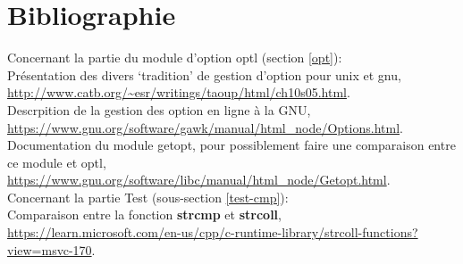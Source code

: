 \documentclass[12pt]{article}
\begin{document}
    \section{Bibliographie}
        \noindent Concernant la partie du module d'option optl 
        (section \ref{opt}):\\ Présentation des divers `tradition' de gestion 
        d'option pour unix et gnu, 
        \url{http://www.catb.org/~esr/writings/taoup/html/ch10s05.html}.\\
        Descrpition de la gestion des option en ligne à la GNU, 
        \url{https://www.gnu.org/software/gawk/manual/html_node/Options.html}.\\
        Documentation du module getopt, pour possiblement faire une comparaison 
        entre ce module et optl, 
        \url{https://www.gnu.org/software/libc/manual/html_node/Getopt.html}.\\
        \noindent Concernant la partie Test (sous-section \ref{test-cmp}):\\
        Comparaison entre la fonction \textbf{strcmp} et \textbf{strcoll}, 
        \url{https://learn.microsoft.com/en-us/cpp/c-runtime-library/strcoll-functions?view=msvc-170}.
\end{document}
